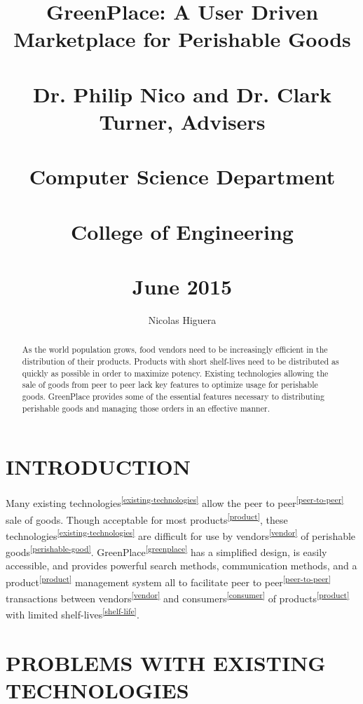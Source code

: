 \documentclass[letterpaper, 10 pt, conference]{ieeeconf}  %
\title{
GreenPlace: A User Driven Marketplace for Perishable Goods\\~\\
Dr. Philip Nico and Dr. Clark Turner, Advisers\\~\\
Computer Science Department\\~\\
College of Engineering\\~\\
June 2015\\
}
\author{Nicolas Higuera}
\begin{document}
\newcommand{\refData}[1]{\textsuperscript{\ref{#1}}}

\onecolumn

\maketitle

\thispagestyle{empty}
\pagestyle{empty}

\begin{abstract}

As the world population grows, food vendors need to be increasingly efficient in the distribution of their products. Products with short shelf-lives need to be distributed as quickly as possible in order to maximize potency. Existing technologies allowing the sale of goods from peer to peer lack key features to optimize usage for perishable goods. GreenPlace provides some of the essential features necessary to distributing perishable goods and managing those orders in an effective manner.

\end{abstract}

\pagebreak
\tableofcontents
\pagebreak

\twocolumn

\section{INTRODUCTION}

Many existing technologies\refData{existing-technologies} allow the peer to peer\refData{peer-to-peer} sale of goods. Though acceptable for most products\refData{product}, these technologies\refData{existing-technologies} are difficult for use by vendors\refData{vendor} of perishable goods\refData{perishable-good}. GreenPlace\refData{greenplace} has a simplified design, is easily accessible, and provides powerful search methods, communication methods, and a product\refData{product} management system all to facilitate peer to peer\refData{peer-to-peer} transactions between vendors\refData{vendor} and consumers\refData{consumer} of products\refData{product} with limited shelf-lives\refData{shelf-life}.

\section{PROBLEMS WITH EXISTING TECHNOLOGIES}
\end{document}
